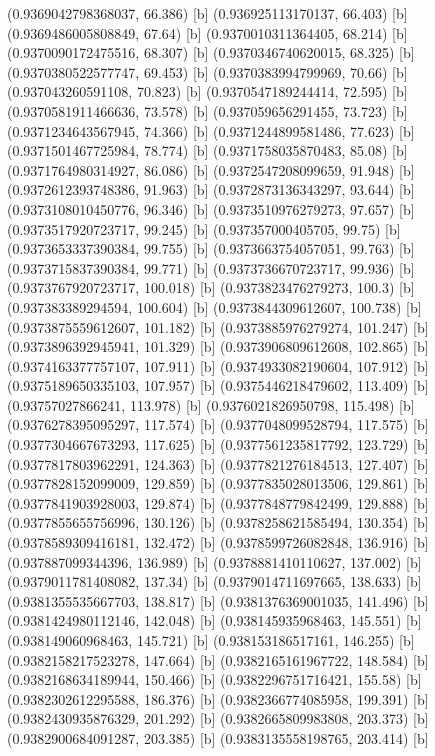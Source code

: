 {{{(0.9369042798368037, 66.386) [b] 
(0.936925113170137, 66.403) [b] 
(0.9369486005808849, 67.64) [b] 
(0.9370010311364405, 68.214) [b] 
(0.9370090172475516, 68.307) [b] 
(0.9370346740620015, 68.325) [b] 
(0.9370380522577747, 69.453) [b] 
(0.9370383994799969, 70.66) [b] 
(0.937043260591108, 70.823) [b] 
(0.9370547189244414, 72.595) [b] 
(0.9370581911466636, 73.578) [b] 
(0.937059656291455, 73.723) [b] 
(0.9371234643567945, 74.366) [b] 
(0.9371244899581486, 77.623) [b] 
(0.9371501467725984, 78.774) [b] 
(0.9371758035870483, 85.08) [b] 
(0.9371764980314927, 86.086) [b] 
(0.9372547208099659, 91.948) [b] 
(0.9372612393748386, 91.963) [b] 
(0.9372873136343297, 93.644) [b] 
(0.9373108010450776, 96.346) [b] 
(0.9373510976279273, 97.657) [b] 
(0.9373517920723717, 99.245) [b] 
(0.937357000405705, 99.75) [b] 
(0.9373653337390384, 99.755) [b] 
(0.9373663754057051, 99.763) [b] 
(0.9373715837390384, 99.771) [b] 
(0.9373736670723717, 99.936) [b] 
(0.9373767920723717, 100.018) [b] 
(0.9373823476279273, 100.3) [b] 
(0.937383389294594, 100.604) [b] 
(0.9373844309612607, 100.738) [b] 
(0.9373875559612607, 101.182) [b] 
(0.9373885976279274, 101.247) [b] 
(0.9373896392945941, 101.329) [b] 
(0.9373906809612608, 102.865) [b] 
(0.9374163377757107, 107.911) [b] 
(0.9374933082190604, 107.912) [b] 
(0.9375189650335103, 107.957) [b] 
(0.9375446218479602, 113.409) [b] 
(0.93757027866241, 113.978) [b] 
(0.9376021826950798, 115.498) [b] 
(0.9376278395095297, 117.574) [b] 
(0.9377048099528794, 117.575) [b] 
(0.9377304667673293, 117.625) [b] 
(0.9377561235817792, 123.729) [b] 
(0.9377817803962291, 124.363) [b] 
(0.9377821276184513, 127.407) [b] 
(0.9377828152099009, 129.859) [b] 
(0.9377835028013506, 129.861) [b] 
(0.9377841903928003, 129.874) [b] 
(0.9377848779842499, 129.888) [b] 
(0.9377855655756996, 130.126) [b] 
(0.9378258621585494, 130.354) [b] 
(0.9378589309416181, 132.472) [b] 
(0.9378599726082848, 136.916) [b] 
(0.937887099344396, 136.989) [b] 
(0.9378881410110627, 137.002) [b] 
(0.9379011781408082, 137.34) [b] 
(0.9379014711697665, 138.633) [b] 
(0.9381355535667703, 138.817) [b] 
(0.9381376369001035, 141.496) [b] 
(0.9381424980112146, 142.048) [b] 
(0.938145935968463, 145.551) [b] 
(0.938149060968463, 145.721) [b] 
(0.938153186517161, 146.255) [b] 
(0.9382158217523278, 147.664) [b] 
(0.9382165161967722, 148.584) [b] 
(0.9382168634189944, 150.466) [b] 
(0.9382296751716421, 155.58) [b] 
(0.9382302612295588, 186.376) [b] 
(0.9382366774085958, 199.391) [b] 
(0.9382430935876329, 201.292) [b] 
(0.9382665809983808, 203.373) [b] 
(0.9382900684091287, 203.385) [b] 
(0.9383135558198765, 203.414) [b] 
}}}
